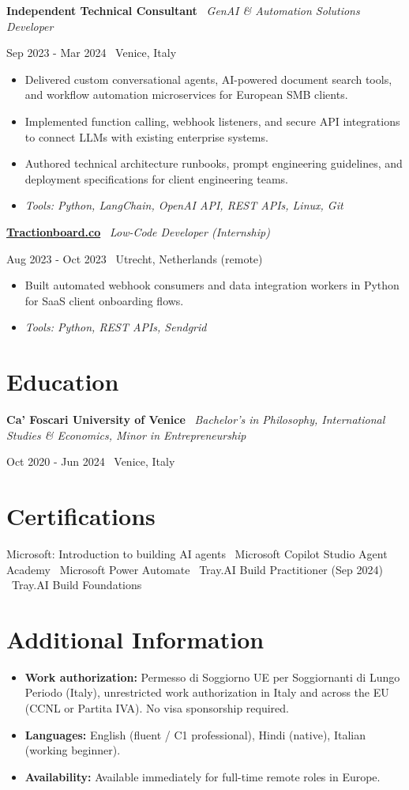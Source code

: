 \documentclass[a4paper,10pt]{article}
\newcommand{\role}[4]{%
  \vspace{2pt}\noindent
  \begin{minipage}[t]{0.70\textwidth}\raggedright\textbf{#1} \textbullet\ \textit{#3}\end{minipage}%
  \hfill
  \begin{minipage}[t]{0.28\textwidth}\raggedleft\footnotesize\color{gray}#2 \textbullet\ #4\end{minipage}%
  \vspace{1pt}%
}
\begin{document}
\role{Independent Technical Consultant}{Sep 2023 - Mar 2024}{GenAI \& Automation Solutions Developer}{Venice, Italy}
\begin{itemize}
  \item Delivered custom conversational agents, AI-powered document search tools, and workflow automation microservices for European SMB clients.
  \item Implemented function calling, webhook listeners, and secure API integrations to connect LLMs with existing enterprise systems.
  \item Authored technical architecture runbooks, prompt engineering guidelines, and deployment specifications for client engineering teams.
  \item \textit{Tools: Python, LangChain, OpenAI API, REST APIs, Linux, Git}
\end{itemize}

\role{\href{https://tractionboard.co}{Tractionboard.co}}{Aug 2023 - Oct 2023}{Low-Code Developer (Internship)}{Utrecht, Netherlands (remote)}
\begin{itemize}
  \item Built automated webhook consumers and data integration workers in Python for SaaS client onboarding flows.
  \item \textit{Tools: Python, REST APIs, Sendgrid}
\end{itemize}

\section{Education}
\role{Ca' Foscari University of Venice}{Oct 2020 - Jun 2024}{Bachelor's in Philosophy, International Studies \& Economics, Minor in Entrepreneurship}{Venice, Italy}

\section{Certifications}
Microsoft: Introduction to building AI agents \textbullet\ Microsoft Copilot Studio Agent Academy \textbullet\ Microsoft Power Automate \textbullet\ Tray.AI Build Practitioner (Sep 2024) \textbullet\ Tray.AI Build Foundations

\section{Additional Information}
\begin{itemize}
  \item \textbf{Work authorization:} Permesso di Soggiorno UE per Soggiornanti di Lungo Periodo (Italy), unrestricted work authorization in Italy and across the EU (CCNL or Partita IVA). No visa sponsorship required.
  \item \textbf{Languages:} English (fluent / C1 professional), Hindi (native), Italian (working beginner).
  \item \textbf{Availability:} Available immediately for full-time remote roles in Europe.
\end{itemize}
\end{document}
